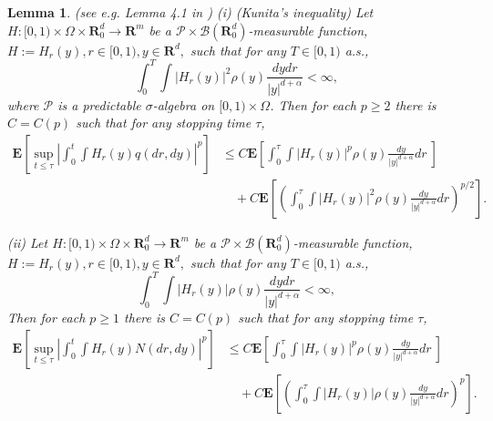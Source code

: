 \documentclass[11pt]{amsart}
\theoremstyle{plain}
\newtheorem{lemma}{Lemma}
\numberwithin{equation}{section}
\begin{document}
\begin{lemma}
\label{ele5}(see e.g. Lemma 4.1 in \cite{lm}) (i) (Kunita's inequality) Let $H:[0,1)\times \Omega \times \mathbf{R}_{0}^{d}\rightarrow \mathbf{R}^{m}$ be
a $\mathcal{P\times B}\left( \mathbf{R}_{0}^{d}\right) $-measurable
function, $H:=H_{r}\left( y\right) ,r\in \lbrack 0,1),y\in \mathbf{R}^{d},$
such that for any $T\in \lbrack 0,1)$ a.s.,\begin{equation*}
\int_{0}^{T}\int \left\vert H_{r}\left( y\right) \right\vert ^{2}\rho \left(
y\right) \frac{dydr}{\left\vert y\right\vert ^{d+\alpha }}<\infty ,
\end{equation*}where $\mathcal{P}$ is a predictable $\sigma $-algebra on $[0,1)\times
\Omega $. Then for each $p\geq 2$ there is $C=C\left( p\right) $ such that
for any stopping time $\tau $, 
\begin{align*}
\mathbf{E}\left[ \sup_{t\leq \tau }\left\vert \int_{0}^{t}\int
H_{r}(y)q(dr,dy)\right\vert ^{p}\right] &\leq C\mathbf{E}\left[
\int_{0}^{\tau }\int \left\vert H_{r}(y)\right\vert ^{p}\rho \left( y\right) 
\frac{dy}{\left\vert y\right\vert ^{d+\alpha }}dr\ \right] \\
&\quad +C\mathbf{E}\left[ \left( \int_{0}^{\tau }\int \left\vert
H_{r}(y)\right\vert ^{2}\rho \left( y\right) \frac{dy}{\left\vert
y\right\vert ^{d+\alpha }}dr\right) ^{p/2}\right] .
\end{align*}

(ii) Let $H:[0,1)\times \Omega \times \mathbf{R}_{0}^{d}\rightarrow \mathbf{R}^{m}$ be a $\mathcal{P\times B}\left( \mathbf{R}_{0}^{d}\right) $-measurable function, $H:=H_{r}\left( y\right) ,r\in \lbrack 0,1),y\in 
\mathbf{R}^{d},$ such that for any $T\in \lbrack 0,1)$ a.s.,\begin{equation*}
\int_{0}^{T}\int \left\vert H_{r}\left( y\right) \right\vert \rho \left(
y\right) \frac{dydr}{\left\vert y\right\vert ^{d+\alpha }}<\infty ,
\end{equation*}Then for each $p\geq 1$ there is $C=C\left( p\right) $ such that for any
stopping time $\tau $, 
\begin{align*}
\mathbf{E}\left[ \sup_{t\leq \tau }\left\vert \int_{0}^{t}\int
H_{r}(y)N(dr,dy)\right\vert ^{p}\right] & \leq C\mathbf{E}\left[
\int_{0}^{\tau }\int \left\vert H_{r}(y)\right\vert ^{p}\rho \left( y\right) 
\frac{dy}{\left\vert y\right\vert ^{d+\alpha }}dr\ \right] \\
& \quad +C\mathbf{E}\left[ \left( \int_{0}^{\tau }\int \left\vert
H_{r}(y)\right\vert \rho \left( y\right) \frac{dy}{\left\vert y\right\vert
^{d+\alpha }}dr\right) ^{p}\right] .
\end{align*}
\end{lemma}
\end{document}
